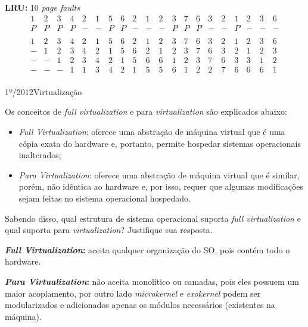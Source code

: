 \begin{exercicio}
  \textbf{LRU:} 10 \textit{page faults} \\
  \[
  \begin{array}{cccccccccccccccccccc}
1 & 2 & 3 & 4 & 2 & 1 & 5 & 6 & 2 & 1 & 2 & 3 & 7 & 6 & 3 & 2 & 1 & 2 & 3 & 6 \\ \hline
P & P & P & P & - & - & P & P & - & - & - & P & P & P & - & - & P & - & - & - \\
\\
1 & 2 & 3 & 4 & 2 & 1 & 5 & 6 & 2 & 1 & 2 & 3 & 7 & 6 & 3 & 2 & 1 & 2 & 3 & 6 \\
- & 1 & 2 & 3 & 4 & 2 & 1 & 5 & 6 & 2 & 1 & 2 & 3 & 7 & 6 & 3 & 2 & 1 & 2 & 3 \\
- & - & 1 & 2 & 3 & 4 & 2 & 1 & 5 & 6 & 6 & 1 & 2 & 3 & 7 & 6 & 3 & 3 & 1 & 2 \\
- & - & - & 1 & 1 & 3 & 4 & 2 & 1 & 5 & 5 & 6 & 1 & 2 & 2 & 7 & 6 & 6 & 6 & 1 \\
  \end{array}
  \]

\end{exercicio}

\begin{exercicio}
  {1º/2012}{Virtualização}
  {Os conceitos de \textit{full virtualization} e para \textit{virtualization} são explicados abaixo:
  \begin{itemize}
    \item \textit{Full Virtualization}: oferece uma abstração de máquina virtual que é uma cópia exata do hardware e, portanto, permite hospedar sistemas operacionais inalterados;
    \item \textit{Para Virtualization}: oferece uma abstração de máquina virtual que é similar, porém, não idêntica ao hardware e, por isso, requer que algumas modificações sejam feitas no sistema operacional hospedado.
  \end{itemize}
  Sabendo disso, qual estrutura de sistema operacional suporta \textit{full virtualization} e qual suporta para \textit{virtualization}? Justifique sua resposta.}

  \textbf{\textit{Full Virtualization}:} aceita qualquer organização do SO, pois contém todo o hardware.

  \textbf{\textit{Para Virtualization}:} não aceita monolítico ou camadas, pois eles possuem um maior acoplamento, por outro lado \textit{microkernel} e \textit{exokernel} podem ser modularizados e adicionados apenas os módulos necessários (existentes na máquina).
\end{exercicio}

